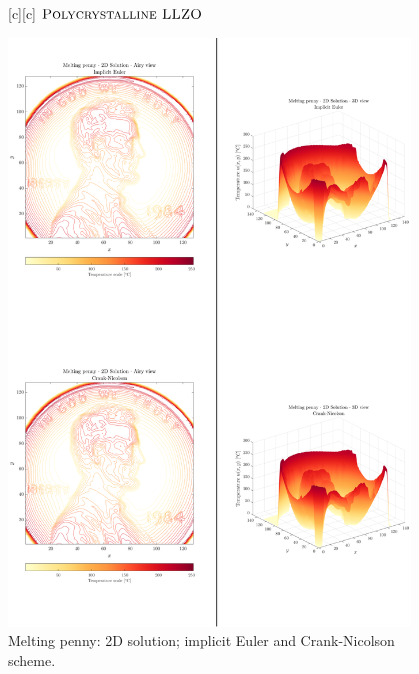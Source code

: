 \begin{figure}[ht!]
	\centering
	\footnotesize

	[c] {$\textsc{Polycrystalline LLZO}$}

	\includegraphics[width=0.95\textwidth]{2DPenny.eps}
	\caption{Melting penny: 2D solution; implicit Euler and Crank-Nicolson scheme.}
	\label{\LABEL}
\end{figure}